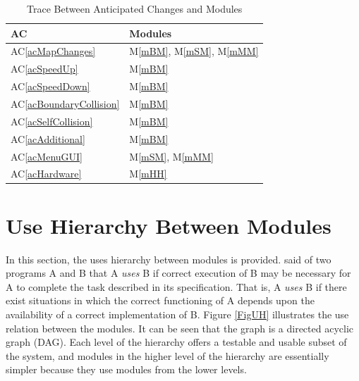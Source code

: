 \documentclass[12pt, titlepage]{article}
\newcommand{\acref}[1]{AC\ref{#1}}
\newcommand{\mref}[1]{M\ref{#1}}
\begin{document}
\begin{table}[H]
\centering
\begin{tabular}{p{} p{}}
\toprule
\textbf{AC} & \textbf{Modules}\\
\midrule
\acref{acMapChanges} & \mref{mBM}, \mref{mSM}, \mref{mMM}\\
\acref{acSpeedUp} & \mref{mBM}\\
\acref{acSpeedDown} & \mref{mBM}\\
\acref{acBoundaryCollision} & \mref{mBM}\\
\acref{acSelfCollision} & \mref{mBM}\\
\acref{acAdditional} & \mref{mBM}\\
\acref{acMenuGUI} & \mref{mSM}, \mref{mMM}\\
\acref{acHardware} & \mref{mHH}\\
\bottomrule
\end{tabular}
\caption{Trace Between Anticipated Changes and Modules}
\label{TblACT}
\end{table}

\section{Use Hierarchy Between Modules} \label{SecUse}

In this section, the uses hierarchy between modules is
provided. \citet{Parnas1978} said of two programs A and B that A {\em uses} B if
correct execution of B may be necessary for A to complete the task described in
its specification. That is, A {\em uses} B if there exist situations in which
the correct functioning of A depends upon the availability of a correct
implementation of B.  Figure \ref{FigUH} illustrates the use relation between
the modules. It can be seen that the graph is a directed acyclic graph
(DAG). Each level of the hierarchy offers a testable and usable subset of the
system, and modules in the higher level of the hierarchy are essentially simpler
because they use modules from the lower levels.
\end{document}
